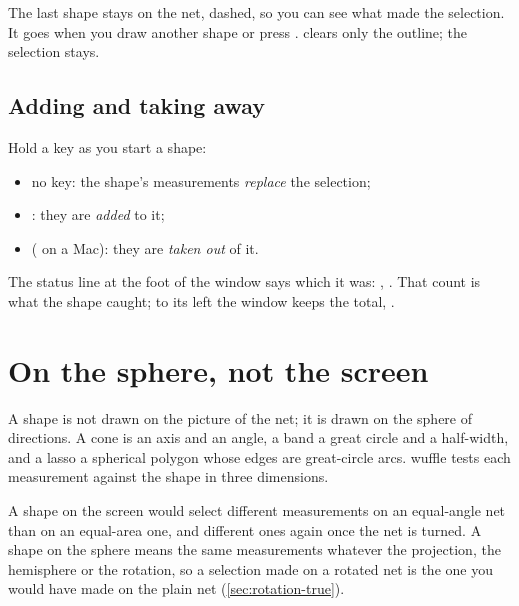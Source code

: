 The last shape stays on the net, dashed, so you can see what made the selection. It goes when you draw
another shape or press .  clears only the outline; the selection stays.

\subsection{Adding and taking away}

Hold a key as you start a shape:

\begin{itemize}
\item no key: the shape's measurements \emph{replace} the selection;
\item {}: they are \emph{added} to it;
\item {} ( on a Mac): they are \emph{taken out} of it.
\end{itemize}

The status line at the foot of the window says which it was: ,
. That count is what the shape caught; to its left the window
keeps the total, .


\section{On the sphere, not the screen}\label{sec:select-sphere}

A shape is not drawn on the picture of the net; it is drawn on the sphere of directions. A cone is an
axis and an angle, a band a great circle and a half-width, and a lasso a spherical polygon whose edges are
great-circle arcs. wuffle tests each measurement against the shape in three dimensions.

\begin{why}
A shape on the screen would select different measurements on an equal-angle net than on an equal-area
one, and different ones again once the net is turned. A shape on the sphere means the same measurements
whatever the projection, the hemisphere or the rotation, so a selection made on a rotated net is the one you
would have made on the plain net (\cref{sec:rotation-true}).
\end{why}

